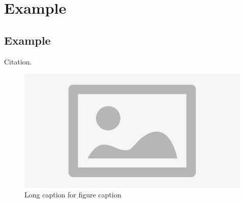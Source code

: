 \chapter{Example}

\section{Example}

Citation\cite{einstein}.

\begin{figure}[p]
    \centering
    \includegraphics[width=\textwidth]{Chapters/01-Example/Media/placeholder.jpg}
    \caption[Short caption for list of figures]{Long caption for figure caption}
    \label{fig:placeholder}
\end{figure}